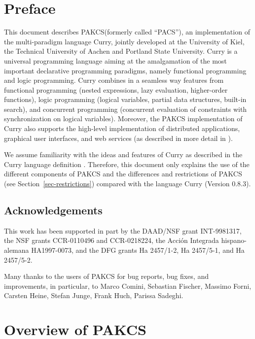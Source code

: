 \documentclass[11pt,fleqn]{article}
\newcommand{\CYS}{PAKCS\xspace} %
\begin{document}
\newpage

\section*{Preface}

This document describes \CYS (formerly called ``PACS''),
an implementation of the multi-paradigm language Curry,
jointly developed at the University of Kiel, the Technical University
of Aachen and Portland State University.
Curry is a universal programming language aiming at the amalgamation
of the most important declarative programming paradigms,
namely functional programming and logic programming.  
Curry combines in a seamless way features from functional programming
(nested expressions, lazy evaluation, higher-order functions),
logic programming (logical variables, partial data structures,
built-in search), and concurrent programming (concurrent evaluation
of constraints with synchronization on logical variables).
Moreover, the \CYS implementation of Curry also supports
the high-level implementation of distributed applications,
graphical user interfaces, and web services
(as described in more detail in \cite{Hanus99PPDP,Hanus00PADL,Hanus01PADL}).

We assume familiarity with the ideas and features
of Curry as described in the Curry language definition \cite{Hanus12Curry}.
Therefore, this document only explains the use of the different
components of \CYS
and the differences and restrictions of \CYS
(see Section~\ref{sec-restrictions})
compared with the language Curry (Version 0.8.3).


\bigskip

\subsection*{Acknowledgements}

This work has been supported in part by the DAAD/NSF grant INT-9981317,
the NSF grants CCR-0110496 and CCR-0218224,
the Acci\'on Integrada hispano-alemana HA1997-0073,
and the DFG grants Ha 2457/1-2, Ha 2457/5-1, and Ha 2457/5-2.

Many thanks to the users of \CYS for bug reports, bug fixes, and improvements,
in particular, to Marco Comini, Sebastian Fischer, Massimo Forni,
Carsten Heine, Stefan Junge, Frank Huch, Parissa Sadeghi.


\newpage

\section{Overview of \CYS}
\end{document}
